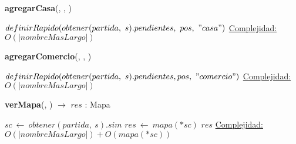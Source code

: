 \begin{Algoritmos}


    \begin{algorithm}[H]{\textbf{agregarCasa}(, , )} %
    \begin{algorithmic}[1]
        \State $definirRapido(obtener(partida,\ s).pendientes,\ pos,\ "casa")$
        \medskip
        \Statex \underline{Complejidad:} $O(|nombreMasLargo|)$
    \end{algorithmic}
    \end{algorithm}
    
    \begin{algorithm}[H]{\textbf{agregarComercio}(, , )} %
    \begin{algorithmic}[1]
        \State $definirRapido(obtener(partida,\ s).pendientes, pos,\ "comercio")$ 
        \medskip
        \Statex \underline{Complejidad:} $O(|nombreMasLargo|)$
    \end{algorithmic}
    \end{algorithm}

    \begin{algorithm}[H]{\textbf{verMapa}(, ) $\to$ $res$ : Mapa}
    \begin{algorithmic}[1]
        \State $sc\ \leftarrow\ obtener(partida,\ s).sim$
        \State $res\ \leftarrow\ mapa(*sc)$ 
        \State \Return $res$
        \medskip
        \Statex \underline{Complejidad:} $O(|nombreMasLargo|) + O(mapa(*sc))$
    \end{algorithmic}
    \end{algorithm}
      

\end{Algoritmos}
